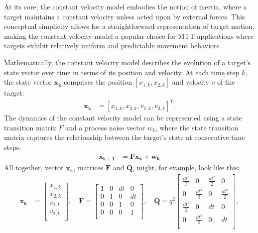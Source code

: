 At its core, the constant velocity model embodies the notion of inertia, where a target maintains a constant velocity unless acted upon by external forces. This conceptual simplicity allows for a straightforward representation of target motion, making the constant velocity model a popular choice for MTT applications where targets exhibit relatively uniform and predictable movement behaviors.

Mathematically, the constant velocity model describes the evolution of a target's state vector over time in terms of
its position and velocity. At each time step $k$, the state vector $\mathbf{x_k}$ comprises the position $[x_{1,k},x_{2,k}]$ and velocity $v$ of the target:
\begin{align}
    \mathbf{x_k} &= [x_{1,k}, x_{2,k}, v_{1,k}, v_{2,k}]^T.
\end{align}
The dynamics of the constant velocity model can be represented using a state transition matrix $F$  and a process
noise vector $w_k$, where the state transition matrix captures the relationship between the target's state at
consecutive time steps:
\begin{align}
    \mathbf{x_{k+1}} &= \mathbf{F x_k} + \mathbf{w_k}
\end{align}
All together, vector $\mathbf{x_k}$, matrices $\mathbf{F}$ and $\mathbf{Q}$, might, for example, look like this:
\begin{align}
    \mathbf{x_k} &=
        \begin{bmatrix}
            x_{1,k} \\
            x_{2,k} \\
            v_{1,k} \\
            v_{2,k} \\
        \end{bmatrix},
    \quad \mathbf{F} =
        \begin{bmatrix}
            1 & 0 & dt & 0 \\
            0 & 1 & 0 & dt \\
            0 & 0 & 1 & 0 \\
            0 & 0 & 0 & 1 \\
        \end{bmatrix},
    \quad \mathbf{Q} = q^2
        \begin{bmatrix}
            \frac{dt^3}{3} & 0 & \frac{dt^2}{2} & 0 \\
            0 & \frac{dt^3}{3} & 0 & \frac{dt^2}{2} \\
            \frac{dt^2}{2} & 0 & dt & 0 \\
            0 & \frac{dt^2}{2} & 0 & dt \\
        \end{bmatrix},
\end{align}
